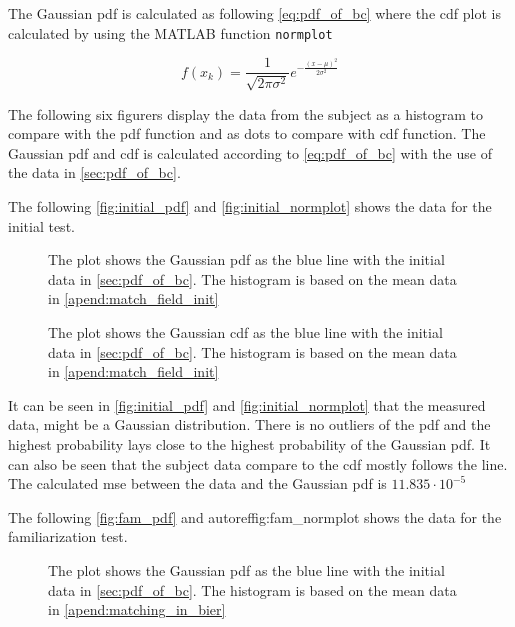  The Gaussian \gls{pdf} is calculated as following \autoref{eq:pdf_of_bc} where the \gls{cdf} plot is calculated by using the MATLAB function \texttt{normplot}

\begin{equation}\label{eq:pdf_of_bc}
f(x_{k}) = \frac{1}{\sqrt{2 \pi \sigma^2}}e^{-\frac{(x-\mu)^2}{2\sigma^2}}
\end{equation}


The following six figurers display the data from the subject as a histogram to compare with the \gls{pdf} function and as dots to compare with \gls{cdf} function. The Gaussian \gls{pdf} and \gls{cdf} is calculated according to \autoref{eq:pdf_of_bc} with the use of the data in \autoref{sec:pdf_of_bc}.


The following \autoref{fig:initial_pdf} and \autoref{fig:initial_normplot} shows the data for the initial test.

 \begin{figure}[H]
	\centering
	
		\caption{The plot shows the Gaussian \gls{pdf} as the blue line with the initial data in \autoref{sec:pdf_of_bc}. The histogram is based on the mean data in \autoref{apend:match_field_init}}
		\label{fig:initial_pdf}
\end{figure}

 \begin{figure}[H]
	\centering
	
		\caption{The plot shows the Gaussian \gls{cdf} as the blue line with the initial data in \autoref{sec:pdf_of_bc}. The histogram is based on the mean data in \autoref{apend:match_field_init}}
		\label{fig:initial_normplot}
\end{figure}


It can be seen in \autoref{fig:initial_pdf} and \autoref{fig:initial_normplot} that the measured data, might be a Gaussian distribution. There is no outliers of the \gls{pdf} and the highest probability lays close to the highest probability of the Gaussian \gls{pdf}. It can also be seen that the subject data compare to the \gls{cdf} mostly follows the line. The calculated \gls{mse} between the data and the Gaussian \gls{pdf} is $11.835 \cdot 10^{-5}$

The following \autoref{fig:fam_pdf} and autoref{fig:fam_normplot}  shows the data for the familiarization test.

 \begin{figure}[H]
	\centering
	
		\caption{The plot shows the Gaussian  \gls{pdf} as the blue line with the initial data in \autoref{sec:pdf_of_bc}. The histogram is based on the mean data in \autoref{apend:matching_in_bier}}
		\label{fig:fam_pdf}
\end{figure}

